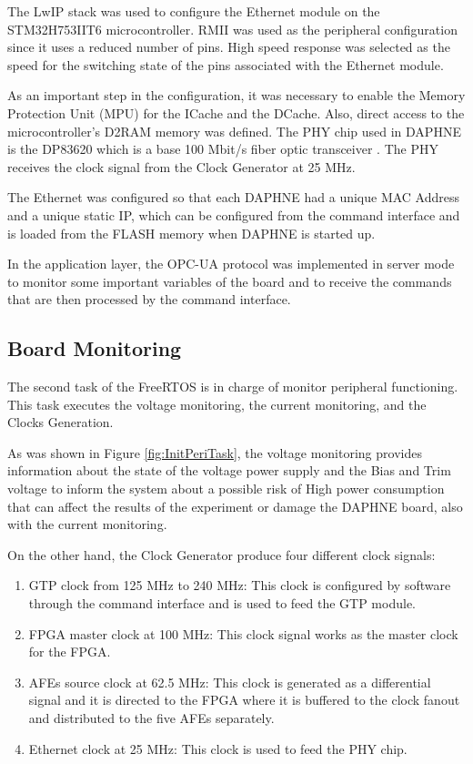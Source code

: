 The LwIP stack was used to configure the Ethernet module on the STM32H753IIT6 microcontroller. RMII was used as the peripheral configuration since it uses a reduced number of pins. High speed response was selected as the speed for the switching state of the pins associated with the Ethernet module.

As an important step in the configuration, it was necessary to enable the Memory Protection Unit (MPU) for the ICache and the DCache. Also, direct access to the microcontroller's D2RAM memory was defined. The PHY chip used in DAPHNE is the DP83620 which is a base 100 Mbit/s fiber optic transceiver \cite{dp83620}. The PHY receives the clock signal from the Clock Generator at 25 MHz.

The Ethernet was configured so that each DAPHNE had a unique MAC Address and a unique static IP, which can be configured from the command interface and is loaded from the FLASH memory when DAPHNE is started up.

In the application layer, the OPC-UA protocol was implemented in server mode to monitor some important variables of the board and to receive the commands that are then processed by the command interface.



\subsection{Board Monitoring}


The second task of the FreeRTOS is in charge of monitor peripheral functioning. This task executes the voltage monitoring, the current monitoring, and the Clocks Generation.

As was shown in Figure \ref{fig:InitPeriTask}, the voltage monitoring provides information about the state of the voltage power supply and the Bias and Trim voltage to inform the system about a possible risk of High power consumption that can affect the results of the experiment or damage the DAPHNE board, also with the current monitoring.

On the other hand, the Clock Generator produce four different clock signals:
 \begin{enumerate}
     \item GTP clock from 125 MHz to 240 MHz: This clock is configured by software through the command interface and is used to feed the GTP module.
     
     \item FPGA master clock at 100 MHz: This clock signal works as the master clock for the FPGA.
     
     \item AFEs source clock at 62.5 MHz: This clock is generated as a differential signal and it is directed to the FPGA where it is buffered to the clock fanout and distributed to the five AFEs separately.
     
     \item Ethernet clock at 25 MHz: This clock is used to feed the PHY chip.
     
 \end{enumerate}
 
